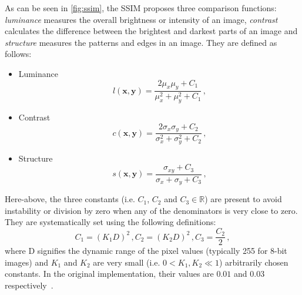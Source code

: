 As can be seen in \autoref{fig:ssim}, the SSIM proposes three comparison functions: \textit{luminance} measures the overall brightness or intensity of an image, \textit{contrast} calculates the difference between the brightest and darkest parts of an image and \textit{structure} measures the patterns and edges in an image. They are defined as follows:
\begin{itemize}
    \item Luminance
          \begin{equation}
              l(\symbf{x}, \symbf{y}) = \dfrac{2 \mu_x \mu_y + C_1}{\mu_x^2 + \mu_y^2 + C_1}\,, \label{eq:lum}
          \end{equation}
    \item Contrast
          \begin{equation}
              c(\symbf{x}, \symbf{y}) = \dfrac{2 \sigma_x \sigma_y + C_2}{\sigma_x^2 + \sigma_y^2 + C_2}\,, \label{eq:con}
          \end{equation}
    \item Structure
          \begin{equation}
              s(\symbf{x}, \symbf{y}) = \dfrac{\sigma_{xy} + C_3}{\sigma_x + \sigma_y + C_3}\,, \label{eq:str}
          \end{equation}
\end{itemize}

Here-above, the three constants (i.e. $C_1$, $C_2$ and $C_3 \in \mathbb{R}$) are present to avoid instability or division by zero when any of the denominators is very close to zero. They are systematically set using the following definitions:
\begin{equation}
    C_1 = (K_1 D)^2 \,, C_2 = (K_2 D) ^ 2 \,, C_3 = \dfrac{C_2}{2} \,,
\end{equation}
where D signifies the dynamic range of the pixel values (typically 255 for 8-bit images) and $K_1$ and $K_2$ are very small (i.e. $0 < K_1, K_2 \ll 1$) arbitrarily chosen constants. In the original implementation, their values are $0.01$ and $0.03$ respectively~\supercite{ssim}.


